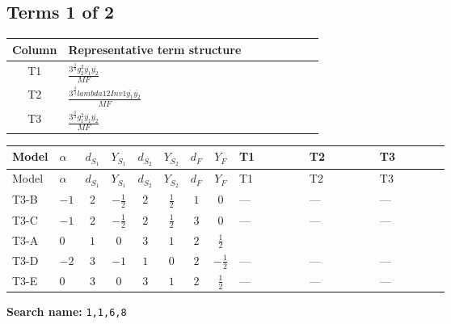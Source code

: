 \documentclass[8pt]{article}
\begin{document}
\begin{landscape}
\subsection*{Terms 1 of 2}
\begin{center}
\begin{tabular}{@{}c >{\raggedright\arraybackslash}p{0.82\linewidth}@{}}
\toprule
Column & Representative term structure \\
\midrule
T1 & \(\displaystyle \frac{3^{\frac{3}{4}} g_{2}^{2} \overline{y_{1}} \overline{y_{2}}}{MF}\) \\
\midrule
T2 & \(\displaystyle \frac{3^{\frac{3}{4}} lambda12Inv1 \overline{y_{1}} \overline{y_{2}}}{MF}\) \\
\midrule
T3 & \(\displaystyle \frac{3^{\frac{3}{4}} g_{1}^{2} \overline{y_{1}} \overline{y_{2}}}{MF}\) \\
\midrule
\bottomrule
\end{tabular}
\end{center}
\smallskip
\tiny
\begin{longtable}{@{}llcccccc >{\raggedright\arraybackslash}p{0.21\linewidth} >{\raggedright\arraybackslash}p{0.21\linewidth} >{\raggedright\arraybackslash}p{0.21\linewidth}@{}}
\toprule
Model & $\alpha$ & $d_{S_1}$ & $Y_{S_1}$ & $d_{S_2}$ & $Y_{S_2}$ & $d_F$ & $Y_F$ & T1 & T2 & T3 \\
\midrule
\endfirsthead
\toprule
Model & $\alpha$ & $d_{S_1}$ & $Y_{S_1}$ & $d_{S_2}$ & $Y_{S_2}$ & $d_F$ & $Y_F$ & T1 & T2 & T3 \\
\midrule
\endhead
T3-B & $-1$ & $2$ & $-\frac{1}{2}$ & $2$ & $\frac{1}{2}$ & $1$ & $0$ & --- & --- & --- \\
\midrule
T3-C & $-1$ & $2$ & $-\frac{1}{2}$ & $2$ & $\frac{1}{2}$ & $3$ & $0$ & --- & --- & --- \\
\midrule
T3-A & $0$ & $1$ & $0$ & $3$ & $1$ & $2$ & $\frac{1}{2}$ & \scriptsize\adjustbox{max width=\linewidth}{$\begin{gathered} - \frac{11 \cdot 3^{\frac{3}{4}} g_{2}^{2} \overline{y_{1}} \overline{y_{2}}}{8 MF}\end{gathered}$} & \scriptsize\adjustbox{max width=\linewidth}{$\begin{gathered} - \frac{3^{\frac{3}{4}} lambda12Inv1 \overline{y_{1}} \overline{y_{2}}}{6 MF}\end{gathered}$} & \scriptsize\adjustbox{max width=\linewidth}{$\begin{gathered} - \frac{3^{\frac{3}{4}} g_{1}^{2} \overline{y_{1}} \overline{y_{2}}}{8 MF}\end{gathered}$} \\
\midrule
T3-D & $-2$ & $3$ & $-1$ & $1$ & $0$ & $2$ & $-\frac{1}{2}$ & --- & --- & --- \\
\midrule
T3-E & $0$ & $3$ & $0$ & $3$ & $1$ & $2$ & $\frac{1}{2}$ & --- & --- & --- \\
\midrule
\bottomrule
\end{longtable}
\clearpage
\noindent\textbf{Search name: }\texttt{1,1,6,8}\par\smallskip

\end{landscape}
\end{document}
